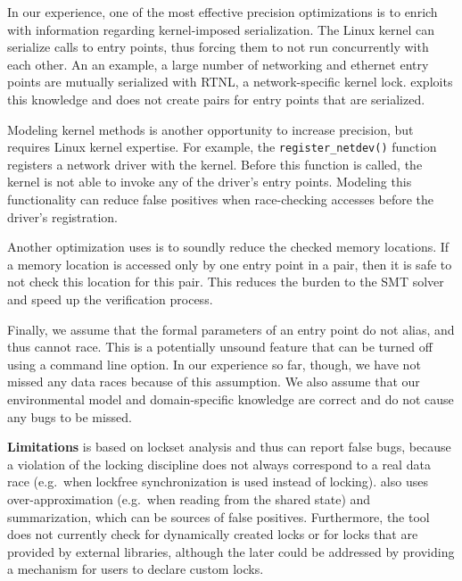 In our experience, one of the most effective precision optimizations is to enrich \whoop with information regarding kernel-imposed serialization. The Linux kernel can serialize calls to entry points, thus forcing them to not run concurrently with each other. An an example, a large number of networking and ethernet entry points are mutually serialized with RTNL, a network-specific kernel lock. \whoop exploits this knowledge and does not create pairs for entry points that are serialized.

Modeling kernel methods is another opportunity to increase precision, but requires Linux kernel expertise. For example, the \texttt{register\_netdev()} function registers a network driver with the kernel. Before this function is called, the kernel is not able to invoke any of the driver's entry points. Modeling this functionality can reduce false positives when race-checking accesses before the driver's registration.

Another optimization \whoop uses is to soundly reduce the checked memory locations. If a memory location is accessed only by one entry point in a pair, then it is safe to not check this location for this pair. This reduces the burden to the SMT solver and speed up the verification process.


Finally, we assume that the formal parameters of an entry point do not alias, and thus cannot race. This is a potentially unsound feature that can be turned off using a command line option. In our experience so far, though, we have not missed any data races because of this assumption. We also assume that our environmental model and domain-specific knowledge are correct and do not cause any bugs to be missed.

\medskip\noindent\textbf{Limitations }
%
\whoop is based on lockset analysis and thus can report false bugs, because a violation of the locking discipline does not always correspond to a real data race (e.g.\ when lockfree synchronization is used instead of locking). \whoop also uses over-approximation (e.g.\ when reading from the shared state) and summarization, which can be sources of false positives. Furthermore, the tool does not currently check for dynamically created locks or for locks that are provided by external libraries, although the later could be addressed by providing a mechanism for users to declare custom locks.

